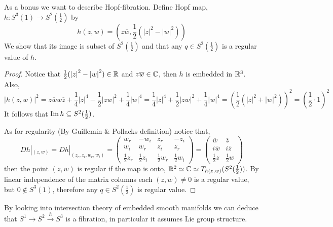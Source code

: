 As a bonus we want to describe Hopf-fibration.
Define Hopf map, $h : S^3(1) \to S^2(\frac{1}{2})$ by
\[
	h(z, w)
	= (z \overline{w}, \frac{1}{2} ({|z|}^2 - {|w|}^2))
\]
We show that its image is subset of $S^2(\frac{1}{2})$ and that any $q \in S^2(\frac{1}{2})$ is a regular value of $h$.
\begin{proof}
	Notice that $\frac{1}{2} ({|z|}^2 - {|w|}^2) \in \mathbb{R}$ and $z \overline{w} \in \mathbb{C}$, then $h$ is embedded in $\mathbb{R}^3$.
	Also,
	\[
		{|h(z, w)|}^2
		= z \overline{w} w \overline{z} + \frac{1}{4} {|z|}^4 - \frac{1}{2} {|zw|}^2 + \frac{1}{4} {|w|}^4
		= \frac{1}{4} {|z|}^4 + \frac{1}{2} {|zw|}^2 + \frac{1}{4} {|w|}^4
		= {\left(\frac{1}{2} ({|z|}^2 + {|w|}^2)\right)}^2
		= {\left(\frac{1}{2} \cdot 1\right)}^2
	\]
	It follows that $\operatorname{Im} h \subseteq S^2(\frac{1}{2})$.

	As for regularity (By Guillemin \& Pollacks definition) notice that,
	\[
		D h |_{(z, w)}
		= D h |_{(z_r, z_i, w_r, w_i)}
		= \begin{pmatrix}
			w_r & - w_i & z_r & -z_i \\
			w_i & w_r & z_i & z_r \\
			\frac{1}{2} z_r & \frac{1}{2} z_i & \frac{1}{2} w_r & \frac{1}{2} w_i
		\end{pmatrix} 
		= \begin{pmatrix}
			\overline{w} & \overline{z} \\
			i \overline{w} & i \overline{z} \\
			\frac{1}{2} z & \frac{1}{2} w
		\end{pmatrix} 
	\]
	then the point $(z, w)$ is regular if the map is onto, $\mathbb{R}^2 \simeq \mathbb{C} \simeq T_{h(z, w)}(S^2(\frac{1}{2}))$.
	By linear independence of the matrix columns each $(z, w) \ne 0$ is a regular value, but $0 \notin S^3(1)$, therefore any $q \in S^2(\frac{1}{2})$ is regular value.
\end{proof}
By looking into intersection theory of embedded smooth manifolds we can deduce that $S^1 \to S^2 \xrightarrow{h} S^3$ is a fibration, in particular it assumes Lie group structure.

